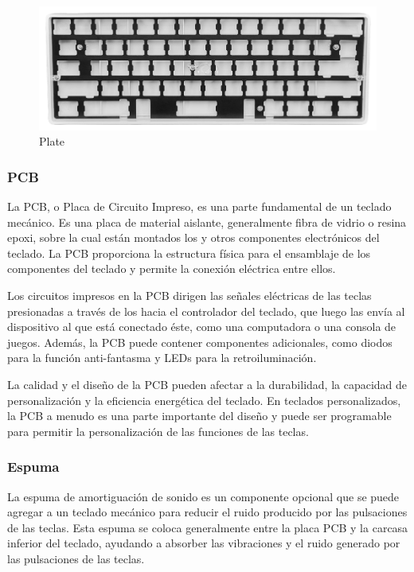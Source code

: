 \begin{figure}[H]
    \centering
    \includegraphics[width=1\textwidth]{imagenes/Capitulos/Cap03/Plate.png}
    \caption{Plate \cite{PlateImageSource}}
    \label{fig:Plate}
\end{figure}

\subsubsection{\gls{PCB}}

La \gls{PCB}, o Placa de Circuito Impreso, es una parte fundamental de un teclado mecánico. Es una placa de material aislante, generalmente fibra de vidrio o resina epoxi, sobre la cual están montados los  y otros componentes electrónicos del teclado. La \gls{PCB} proporciona la estructura física para el ensamblaje de los componentes del teclado y permite la conexión eléctrica entre ellos.

Los circuitos impresos en la \gls{PCB} dirigen las señales eléctricas de las teclas presionadas a través de los  hacia el controlador del teclado, que luego las envía al dispositivo al que está conectado éste, como una computadora o una consola de juegos. Además, la \gls{PCB} puede contener componentes adicionales, como diodos para la función anti-fantasma y \gls{LED}s para la retroiluminación.

La calidad y el diseño de la \gls{PCB} pueden afectar a la durabilidad, la capacidad de personalización y la eficiencia energética del teclado. En teclados personalizados, la \gls{PCB} a menudo es una parte importante del diseño y puede ser programable para permitir la personalización de las funciones de las teclas.

\subsubsection{Espuma}

La espuma de amortiguación de sonido es un componente opcional que se puede agregar a un teclado mecánico para reducir el ruido producido por las pulsaciones de las teclas. Esta espuma se coloca generalmente entre la placa \gls{PCB} y la carcasa inferior del teclado, ayudando a absorber las vibraciones y el ruido generado por las pulsaciones de las teclas.

